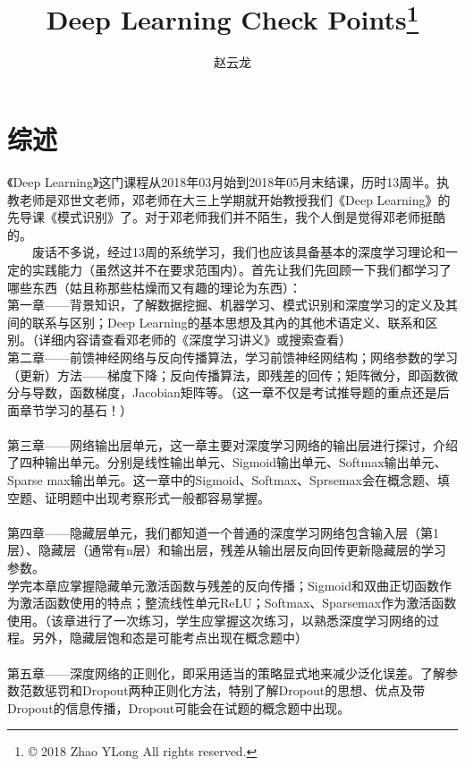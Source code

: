 \documentclass[UFT8]{ctexart}
\author{赵云龙}
\title{Deep Learning Check Points\footnote{© 2018 Zhao YLong All rights reserved.}}
\begin{document}
\maketitle
\tableofcontents  \newpage
\section{综述} 
	《Deep Learning》这门课程从2018年03月始到2018年05月末结课，历时13周半。执教老师是邓世文老师，邓老师在大三上学期就开始教授我们《Deep Learning》的先导课《模式识别》了。对于邓老师我们并不陌生，我个人倒是觉得邓老师挺酷的。\newline
~\\
$\qquad $废话不多说，经过13周的系统学习，我们也应该具备基本的深度学习理论和一定的实践能力（虽然这并不在要求范围内）。首先让我们先回顾一下我们都学习了哪些东西（姑且称那些枯燥而又有趣的理论为东西）：\newline
~\\
\qquad 第一章——背景知识，了解数据挖掘、机器学习、模式识别和深度学习的定义及其间的联系与区别；Deep Learning的基本思想及其內的其他术语定义、联系和区别。（详细内容请查看邓老师的《深度学习讲义》或搜索查看）\newline
~\\
\qquad 第二章——前馈神经网络与反向传播算法，学习前馈神经网结构；网络参数的学习（更新）方法——梯度下降；反向传播算法，即残差的回传；矩阵微分，即函数微分与导数，函数梯度，Jacobian矩阵等。（这一章不仅是考试推导题的重点还是后面章节学习的基石！）\\
~\\
\qquad 第三章——网络输出层单元，这一章主要对深度学习网络的输出层进行探讨，介绍了四种输出单元。分别是线性输出单元、Sigmoid输出单元、Softmax输出单元、Sparse max输出单元。这一章中的Sigmoid、Softmax、Sprsemax会在概念题、填空题、证明题中出现考察形式一般都容易掌握。\\
~\\
\qquad 第四章——隐藏层单元，我们都知道一个普通的深度学习网络包含输入层（第1层）、隐藏层（通常有n层）和输出层，残差从输出层反向回传更新隐藏层的学习参数。\\
学完本章应掌握隐藏单元激活函数与残差的反向传播；Sigmoid和双曲正切函数作为激活函数使用的特点；整流线性单元ReLU；Softmax、Sparsemax作为激活函数使用。（该章进行了一次练习，学生应掌握这次练习，以熟悉深度学习网络的过程。另外，隐藏层饱和态是可能考点出现在概念题中）\\
~\\
\qquad 第五章——深度网络的正则化，即采用适当的策略显式地来减少泛化误差。了解参数范数惩罚和Dropout两种正则化方法，特别了解Dropout的思想、优点及带Dropout的信息传播，Dropout可能会在试题的概念题中出现。\\
\end{document}
